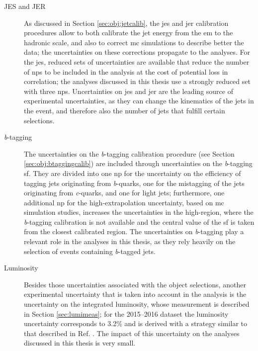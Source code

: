 \begin{description}

\item[JES and JER] As discussed in Section \ref{sec:obj:jetcalib}, the \gls{jes} and \gls{jer} calibration procedures allow to both calibrate the jet energy from the \gls{em} to the
hadronic scale, and also to correct \gls{mc} simulations to describe better the data; the uncertainties on these corrections propagate to the analyses. 
For the \gls{jes}, reduced sets of uncertainties are available that reduce the number of \glspl{np} to be included in the analysis at the cost of potential loss in correlation; 
the analyses discussed in this thesis use a strongly reduced set with three \glspl{np}. 
Uncertainties on \gls{jes} and \gls{jer} are the leading source of experimental uncertainties, as they can change the kinematics of the jets in the event, and therefore also the number
of jets that fulfill certain selections.

\item[\textit{b}-tagging] The uncertainties on the \textit{b}-tagging calibration procedure (see Section \ref{sec:obj:btaggingcalib}) are included through uncertainties on the \textit{b}-tagging \gls{sf}. 
They are divided into one \gls{np} for the uncertainty on the efficiency of tagging jets originating from \textit{b}-quarks, 
one for the mistagging of the jets originating from 
\textit{c}-quarks, and one for light jets; 
furthermore, one additional \gls{np} for the high-\pt extrapolation uncertainty, based on \gls{mc} simulation studies, 
increases the uncertainties in the high-\pt region, where the \textit{b}-tagging calibration is not available and the central 
value of the \gls{sf} is taken from the closest calibrated \pt region. 
The uncertainties on \textit{b}-tagging play a relevant role in the analyses in this thesis, as they rely heavily on the selection of events containing \textit{b}-tagged jets.

\item[Luminosity] Besides those uncertainties associated with the object selections, 
another experimental uncertainty that is taken into account in the analysis is 
the uncertainty on the integrated luminosity, whose measurement is described in Section \ref{sec:lumimeas}; for the 2015--2016 dataset the luminosity uncertainty corresponds 
to 3.2\% and is derived with a strategy similar to that described in Ref. \cite{Aaboud:2016hhf}. The impact of this uncertainty on the analyses discussed in this thesis is very small.

\end{description}

